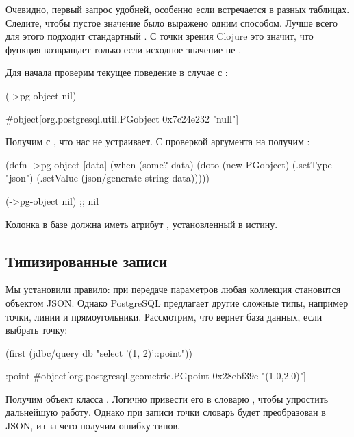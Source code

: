 Очевидно, первый запрос удобней, особенно если  встречается в разных таблицах. Следите, чтобы пустое значение было выражено одним способом. Лучше всего для этого подходит стандартный . С точки зрения Clojure это значит, что функция  возвращает  только если исходное значение не .

Для начала проверим текущее поведение в случае с :

\begin{english}
  \begin{clojure}
(->pg-object nil)

#object[org.postgresql.util.PGobject 0x7c24e232 "null"]
  \end{clojure}
\end{english}

Получим  с , что нас не устраивает. С проверкой аргумента на  получим :

\begin{english}
  \begin{clojure}
(defn ->pg-object [data]
  (when (some? data)
    (doto (new PGobject)
      (.setType "json")
      (.setValue (json/generate-string data)))))

(->pg-object nil) ;; nil
  \end{clojure}
\end{english}

Колонка в базе должна иметь атрибут , установленный в истину.

\subsection{Типизированные записи}

Мы установили правило: при передаче параметров любая коллекция становится объектом JSON. Однако PostgreSQL предлагает другие сложные типы, например точки, линии и прямоугольники. Рассмотрим, что вернет база данных, если выбрать точку:

\begin{english}
  \begin{clojure}
(first (jdbc/query db "select '(1, 2)'::point"))

{:point #object[org.postgresql.geometric.PGpoint 0x28ebf39e "(1.0,2.0)"]}
  \end{clojure}
\end{english}

Получим объект класса . Логично привести его в словарю , чтобы упростить дальнейшую работу. Однако при записи точки словарь будет преобразован в JSON, из-за чего получим ошибку типов.

